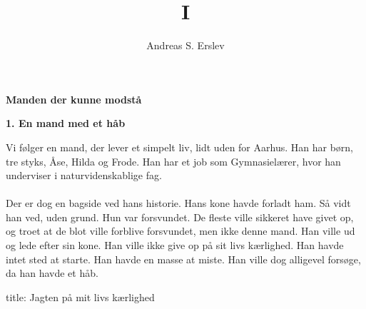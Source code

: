 \documentclass[]{article}
\title{I}
\author{Andreas S. Erslev}
\begin{document}
	
\begin{center}
	\Large\textbf{Manden der kunne modstå}
\end{center}

\begin{center}
	\large\textbf{1. En mand med et håb}
\end{center}

Vi følger en mand, der lever et simpelt liv, lidt uden for Aarhus. Han har børn, tre styks, Åse, Hilda og Frode. Han har et job som Gymnasielærer, hvor han underviser i naturvidenskablige fag. 
\\ \\
Der er dog en bagside ved hans historie. Hans kone havde forladt ham. Så vidt han ved, uden grund. Hun var forsvundet. De fleste ville sikkeret have givet op, og troet at de blot ville forblive forsvundet, men ikke denne mand. Han ville ud og lede efter sin kone. Han ville ikke give op på sit livs kærlighed. Han havde intet sted at starte. Han havde en masse at miste. Han ville dog alligevel forsøge, da han havde et håb.


title: Jagten på mit livs kærlighed
\end{document}
